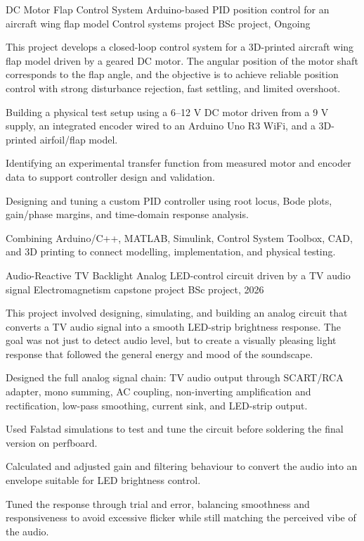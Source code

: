 \projectentry
  {DC Motor Flap Control System}
  {Arduino-based PID position control for an aircraft wing flap model}
  {Control systems project}
  {BSc project, Ongoing}
  {    }
  {\flapfigure}
  {This project develops a closed-loop control system for a 3D-printed aircraft wing flap model driven by a geared DC motor. The angular position of the motor shaft corresponds to the flap angle, and the objective is to achieve reliable position control with strong disturbance rejection, fast settling, and limited overshoot.

  \begin{projectbullets}
    \item Building a physical test setup using a 6–12 V DC motor driven from a 9 V supply, an integrated encoder wired to an Arduino Uno R3 WiFi, and a 3D-printed airfoil/flap model.
    \item Identifying an experimental transfer function from measured motor and encoder data to support controller design and validation.
    \item Designing and tuning a custom PID controller using root locus, Bode plots, gain/phase margins, and time-domain response analysis.
    \item Combining Arduino/C++, MATLAB, Simulink, Control System Toolbox, CAD, and 3D printing to connect modelling, implementation, and physical testing.
  \end{projectbullets}}

\projectseparator

\projectentry
  {Audio-Reactive TV Backlight}
  {Analog LED-control circuit driven by a TV audio signal}
  {Electromagnetism capstone project}
  {BSc project, 2026}
  {    }
  {\leddriverfigure}
  {This project involved designing, simulating, and building an analog circuit that converts a TV audio signal into a smooth LED-strip brightness response. The goal was not just to detect audio level, but to create a visually pleasing light response that followed the general energy and mood of the soundscape.

  \begin{projectbullets}
    \item Designed the full analog signal chain: TV audio output through SCART/RCA adapter, mono summing, AC coupling, non-inverting amplification and rectification, low-pass smoothing, current sink, and LED-strip output.
    \item Used Falstad simulations to test and tune the circuit before soldering the final version on perfboard.
    \item Calculated and adjusted gain and filtering behaviour to convert the audio into an envelope suitable for LED brightness control.
    \item Tuned the response through trial and error, balancing smoothness and responsiveness to avoid excessive flicker while still matching the perceived vibe of the audio.
  \end{projectbullets}}

